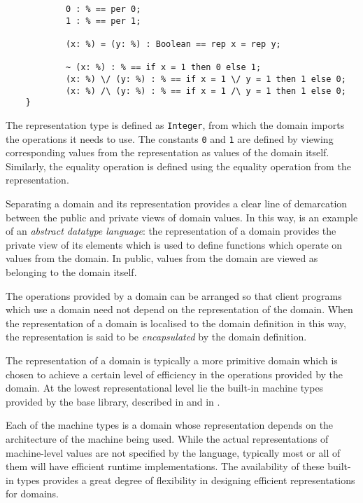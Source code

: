 {\begin{small}
\begin{verbatim}
            0 : % == per 0;
            1 : % == per 1;

            (x: %) = (y: %) : Boolean == rep x = rep y;

            ~ (x: %) : % == if x = 1 then 0 else 1;
            (x: %) \/ (y: %) : % == if x = 1 \/ y = 1 then 1 else 0;
            (x: %) /\ (y: %) : % == if x = 1 /\ y = 1 then 1 else 0;
    }
\end{verbatim}
\end{small}

The representation type is defined as \verb"Integer", from which
the domain imports the operations it needs to use.
The constants \verb"0" and \verb"1" are defined by viewing corresponding
values from the representation as values of the domain itself.
Similarly, the equality operation is defined using the equality operation
from the representation.

Separating a domain and its representation provides a clear line
of demarcation between the public and private views of domain values.
In this way, \asharp{} is an example of an {\em abstract datatype language\/}:
the representation of a domain provides the private view of its elements
which is used to define functions which operate on values from the domain.
In public, values from the domain are viewed as belonging to the domain itself.

\label{asugLangNTypeDomEncap}
The operations provided by a domain can be arranged so that client programs
which use a domain need not depend on the representation of the domain.
When the representation of a domain is localised to the domain definition
in this way, the representation is said to be {\em encapsulated\/} by the
domain definition.

The representation of a domain is typically a more primitive domain which
is chosen to achieve a certain level of efficiency in the operations provided
by the domain.  At the lowest representational level lie the built-in machine
types provided by the \asharp{} base library, described in
 and in .

Each of the machine types is a domain whose representation depends on the
architecture of the machine being used.  While the actual representations
of machine-level values are not specified by the language, typically most or
all of them will have efficient runtime implementations.  The availability
of these built-in types provides a great degree of flexibility in designing
efficient representations for \asharp{} domains.

}
